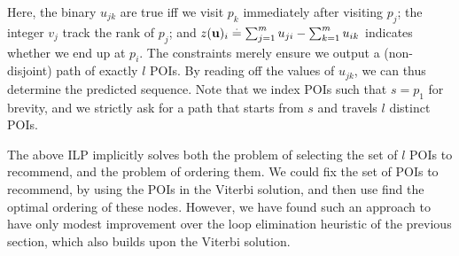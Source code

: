 \vspace{0.5\baselineskip}

Here, the binary $u_{jk}$ are true iff
we visit $p_k$ immediately after visiting $p_j$;
the integer $v_j$ track the rank of $p_j$;
and $z(\mathbf{u})_i \stackrel{.}{=} \sum_{j=1}^m u_{ji} - \sum_{k=1}^m u_{ik}$ indicates whether we end up at $p_i$.
The constraints merely ensure we output a (non-disjoint) path of exactly $l$ POIs.
By reading off the values of $u_{jk}$, we can thus determine the predicted sequence.
Note that we index POIs such that $s = p_1$ for brevity,
and we strictly ask for a path that starts from $s$ and travels $l$ distinct POIs.

The above ILP implicitly solves both the problem of selecting the set of $l$ POIs to recommend,
and the problem of ordering them.
We could fix the set of POIs to recommend, \eg by using the POIs in the Viterbi solution, and then use find the optimal ordering of these nodes.
However, we have found such an approach to have only modest improvement over the loop elimination heuristic of the previous section, which also builds upon the Viterbi solution.
